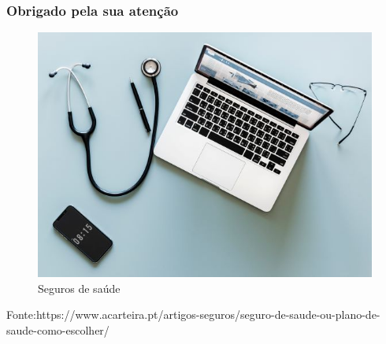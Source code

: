 \documentclass[11pt, xcolor=table]{beamer}
\begin{document}
\clearpage

\begin{frame}
\frametitle{Obrigado pela sua atenção}
\begin{figure}
\includegraphics[scale=0.35]{seguro-saude (1).jpg}
\caption{Seguros de saúde}
\label{Fig:2}
\end{figure}
Fonte:https://www.acarteira.pt/artigos-seguros/seguro-de-saude-ou-plano-de-saude-como-escolher/
\end{frame}
\end{document}
